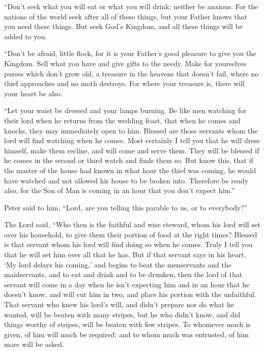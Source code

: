  ``Don't seek what you will eat or what you will drink;
neither be anxious.  For the nations of the world seek
after all of these things, but your Father knows that you need these
things.  But seek God's Kingdom, and all these things will
be added to you.

 ``Don't be afraid, little flock, for it is your Father's
good pleasure to give you the Kingdom.  Sell what you have
and give gifts to the needy. Make for yourselves purses which don't grow
old, a treasure in the heavens that doesn't fail, where no thief
approaches and no moth destroys.  For where your treasure
is, there will your heart be also.

 ``Let your waist be dressed and your lamps burning.
 Be like men watching for their lord when he returns from
the wedding feast, that when he comes and knocks, they may immediately
open to him.  Blessed are those servants whom the lord will
find watching when he comes. Most certainly I tell you that he will
dress himself, make them recline, and will come and serve them.
 They will be blessed if he comes in the second or third
watch and finds them so.  But know this, that if the master
of the house had known in what hour the thief was coming, he would have
watched and not allowed his house to be broken into. 
Therefore be ready also, for the Son of Man is coming in an hour that
you don't expect him.''

 Peter said to him, ``Lord, are you telling this parable to
us, or to everybody?''

 The Lord said, ``Who then is the faithful and wise
steward, whom his lord will set over his household, to give them their
portion of food at the right times?  Blessed is that
servant whom his lord will find doing so when he comes. 
Truly I tell you that he will set him over all that he has.
 But if that servant says in his heart, `My lord delays his
coming,' and begins to beat the menservants and the maidservants, and to
eat and drink and to be drunken,  then the lord of that
servant will come in a day when he isn't expecting him and in an hour
that he doesn't know, and will cut him in two, and place his portion
with the unfaithful.  That servant who knew his lord's
will, and didn't prepare nor do what he wanted, will be beaten with many
stripes,  but he who didn't know, and did things worthy of
stripes, will be beaten with few stripes. To whomever much is given, of
him will much be required; and to whom much was entrusted, of him more
will be asked.

